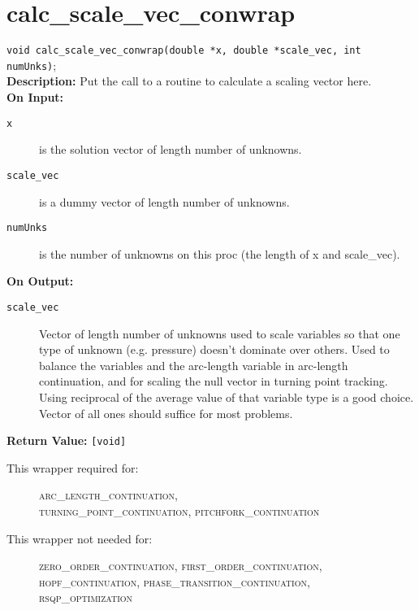 \section{calc\_scale\_vec\_conwrap}
\texttt{void calc\_scale\_vec\_conwrap(double *x, double *scale\_vec, int numUnks)}; \\

{\bf Description:}  Put the call to a routine to calculate a scaling vector here.\\

{\bf On Input:}
\begin{description}
\item[\texttt{x}] is the solution vector of length number of unknowns.
\item[\texttt{scale\_vec}] is a dummy vector of length number of unknowns.
\item[\texttt{numUnks}]  is the number of unknowns on this proc (the length of x and scale\_vec).
\end{description}

{\bf On Output:}
\begin{description}
\item[\texttt{scale\_vec}]  Vector of length number of unknowns used to scale variables so that one type of unknown (e.g. pressure) doesn't dominate over others. Used to balance the variables and the arc-length variable in arc-length continuation, and for scaling the null vector in turning point tracking. Using reciprocal of the average value of that variable type is a good choice. Vector of all ones should suffice for most problems.
\end{description}

{\bf Return Value:} \texttt{[void]}

\begin{description}
\item[This wrapper required for:]
\textsc{arc\_length\_continuation, \\
turning\_point\_continuation, pitchfork\_continuation \\
}
\item[This wrapper not needed for:]
\textsc{zero\_order\_continuation, first\_order\_continuation, \\
hopf\_continuation, phase\_transition\_continuation, \\
rsqp\_optimization}
\end{description}


